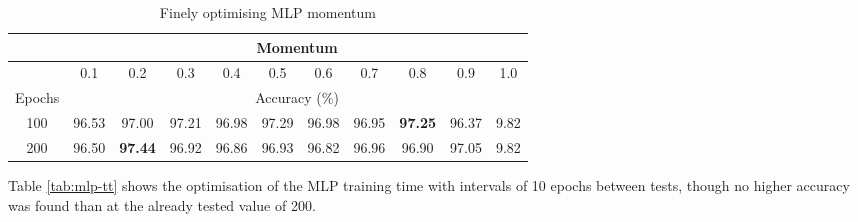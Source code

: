 \documentclass[12pt]{article}
\begin{document}
    \begin{table}[H]
      \centering
      \begin{tabular}{c|cccccccccc}
        \toprule
              & \multicolumn{10}{c}{Momentum} \\
        \midrule
              & \multicolumn{1}{c|}{0.1} & \multicolumn{1}{c|}{0.2} & \multicolumn{1}{c|}{0.3} & \multicolumn{1}{c|}{0.4} & \multicolumn{1}{c|}{0.5} & \multicolumn{1}{c|}{0.6} & \multicolumn{1}{c|}{0.7} & \multicolumn{1}{c|}{0.8} & \multicolumn{1}{c|}{0.9} & 1.0 \\
        \midrule
        Epochs & \multicolumn{10}{c}{Accuracy (\%)} \\
        \midrule
        100   & 96.53 & 97.00 & 97.21 & 96.98 & 97.29 & 96.98 & 96.95 & \textbf{97.25} & 96.37 & 9.82 \\
        200   & 96.50 & \textbf{97.44} & 96.92 & 96.86 & 96.93 & 96.82 & 96.96 & 96.90 & 97.05 & 9.82 \\
        \bottomrule
      \end{tabular}%
      \caption{Finely optimising MLP momentum}
      \label{tab:mlp-m-2}%
    \end{table}%

    Table \ref{tab:mlp-tt} shows the optimisation of the MLP training time with intervals of 10 epochs between tests, though no higher accuracy was found than at the already tested value of 200.
\end{document}
